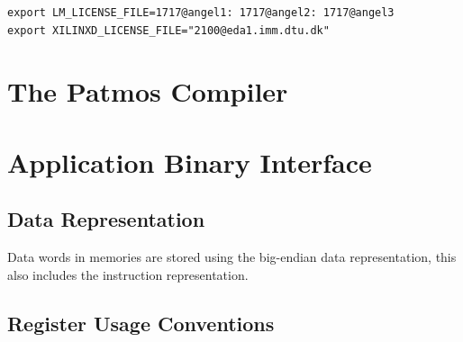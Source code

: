 \documentclass[a4paper,fontsize=10pt,twoside,DIV15,BCOR12mm,headinclude=true,footinclude=false,pagesize,bibtotoc]{scrbook}
\begin{document}
\begin{verbatim}
export LM_LICENSE_FILE=1717@angel1: 1717@angel2: 1717@angel3
export XILINXD_LICENSE_FILE="2100@eda1.imm.dtu.dk"
\end{verbatim}



\chapter{The Patmos Compiler}
\label{sec:compiler}




\chapter{Application Binary Interface}
\label{sec:abi}

\section{Data Representation}

Data words in memories are stored using the big-endian data representation, this
also includes the instruction representation.

\section{Register Usage Conventions}
\end{document}
